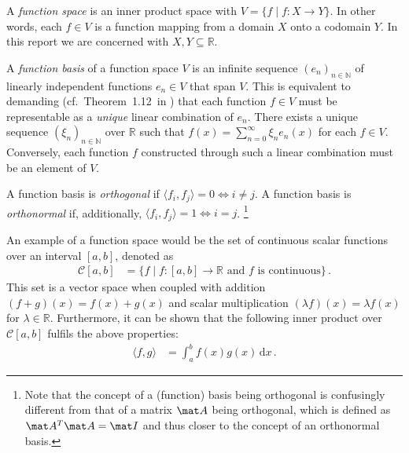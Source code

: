 \begin{definition}
 	A \emph{function space} is an inner product space with $V = \{ f \mid f : X \longrightarrow Y\}$. In other words, each $f \in V$ is a function mapping from a domain $X$ onto a codomain $Y$.
 	In this report we are concerned with $X, Y \subseteq \mathbb{R}$.
\end{definition}

\begin{definition}
 	A \emph{function basis} of a function space $V$ is an infinite sequence $(e_n)_{n \in \mathbb{N}}$ of linearly independent functions $e_n \in V$ that span $V$.
 	This is equivalent to demanding (cf.~Theorem~1.12~in \cite{hefferon2020linear}) that each function $f \in V$ must be representable as a \emph{unique} linear combination of $e_n$.
 	There exists a unique sequence $(\xi_n)_{n \in \mathbb{N}}$ over $\mathbb{R}$ such that $f(x) = \sum_{n = 0}^\infty \xi_n e_n(x)$ for each $f \in V$.
 	Conversely, each function $f$ constructed through such a linear combination must be an element of $V$.
\end{definition}

\begin{definition}
 	A function basis is \emph{orthogonal} if $\langle f_i, f_j \rangle = 0 \Leftrightarrow i \neq j$. A function basis is \emph{orthonormal} if, additionally,  $\langle f_i, f_j \rangle = 1 \Leftrightarrow i = j$.%
 	\footnote{Note that the concept of a (function) basis being orthogonal is confusingly different from that of a matrix $\mat A$ being orthogonal, which is defined as $\mat A^T \mat A = \mat I$ and thus closer to the concept of an orthonormal basis.}
\end{definition}

\begin{example}
An example of a function space would be the set of continuous scalar functions over an interval $[a, b]$, denoted as
\begin{align*}
 	\mathcal{C}[a, b] &= \{ f \mid f : [a, b] \longrightarrow \mathbb{R} \text{ and } f \text{ is continuous} \} \,.
\end{align*}
This set is a vector space when coupled with addition $(f + g)(x) = f(x) + g(x)$ and scalar multiplication $(\lambda f)(x) = \lambda f(x)$ for $\lambda \in \mathbb{R}$. Furthermore, it can be shown that the following inner product over $\mathcal{C}[a, b]$ fulfils the above properties:
\begin{align}
 	\langle f, g \rangle &= \int_a^b f(x) g(x) \,\mathrm{d}x \,.
 	\label{eqn:C_inner_product}
\end{align}
\end{example}

